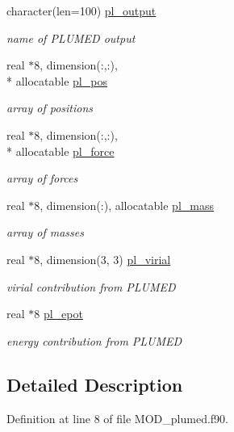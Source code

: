 \begin{DoxyCompactItemize}
character(len=100) \hyperlink{classplumed_a2318a38b3aa942f80ae7dbe6b2c3f240}{pl\-\_\-output}
\begin{DoxyCompactList}\small\item\em name of P\-L\-U\-M\-E\-D output \end{DoxyCompactList}\item 
real $\ast$8, dimension(\-:,\-:), \\*
allocatable \hyperlink{classplumed_a12c6013d273e295dc9e85bd9521256be}{pl\-\_\-pos}
\begin{DoxyCompactList}\small\item\em array of positions \end{DoxyCompactList}\item 
real $\ast$8, dimension(\-:,\-:), \\*
allocatable \hyperlink{classplumed_a9df9be4d1fe11d88a9dcf400d3c43b7a}{pl\-\_\-force}
\begin{DoxyCompactList}\small\item\em array of forces \end{DoxyCompactList}\item 
real $\ast$8, dimension(\-:), allocatable \hyperlink{classplumed_aa02a55eef8aee0ddceb17c8b9dcf40c2}{pl\-\_\-mass}
\begin{DoxyCompactList}\small\item\em array of masses \end{DoxyCompactList}\item 
real $\ast$8, dimension(3, 3) \hyperlink{classplumed_a96e7d3b44d60f89f9d46d3c51c4c2ecf}{pl\-\_\-virial}
\begin{DoxyCompactList}\small\item\em virial contribution from P\-L\-U\-M\-E\-D \end{DoxyCompactList}\item 
real $\ast$8 \hyperlink{classplumed_a22629a6612c2ebc50f88c7ef94bdd525}{pl\-\_\-epot}
\begin{DoxyCompactList}\small\item\em energy contribution from P\-L\-U\-M\-E\-D \end{DoxyCompactList}\end{DoxyCompactItemize}


\subsection{Detailed Description}


Definition at line 8 of file M\-O\-D\-\_\-plumed.\-f90.



